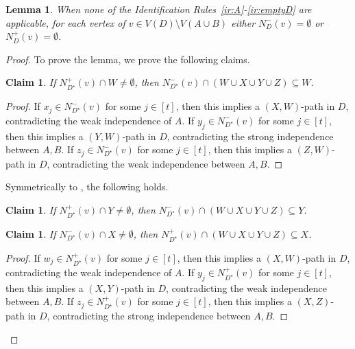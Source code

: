\documentclass[a4paper,11pt]{article}
\theoremstyle{plain}
\newtheorem{lemma}[theorem]{Lemma}
\newtheorem{claim}[theorem]{Claim}
\newtheorem{identification rule}{Identification Rule}
\theoremstyle{definition}
\theoremstyle{remark}
\newenvironment{claimproof}{\begin{proof}\renewcommand{\qedsymbol}{\claimqed}}{\end{proof}\renewcommand{\qedsymbol}{\plainqed}}
\let\plainqed\qedsymbol
\newcommand{\claimqed}{$\lrcorner$}
\begin{document}
\begin{lemma}\label{lem:ordered-cleaning-exhaustive}
When none of the Identification Rules~\ref{ir:A}-\ref{ir:emptyD} are applicable, for each vertex of $v \in V(D) \setminus V(A\cup B)$ either $N_D^-(v) =\emptyset$ or $N_D^+(v) = \emptyset$.
\end{lemma}
\begin{proof}
To prove the lemma, we prove the following claims.

\begin{claim}\label{claim:ordered-ir}
If $N_{D^{\star}}^+(v) \cap W \neq \emptyset$, then
$ N_{D^{\star}}^-(v) \cap (W \cup X \cup Y \cup Z) \subseteq W$. 
\end{claim}

\begin{claimproof}
If $x_j \in N_{D^{\star}}^-(v) $ for some $j \in [t]$, then this implies a $(X,W)$-path in $D$, contradicting the weak independence of $A$.
If $y_j \in N_{D^{\star}}^-(v)$ for some $j \in [t]$, then this implies a $(Y,W)$-path in $D$, contradicting the strong independence between $A,B$. 
If $z_j \in N_{D^{\star}}^-(v)$ for some $j \in [t]$, then this implies a $(Z,W)$-path in $D$, contradicting the weak independence between $A,B$. 
\end{claimproof}

Symmetrically to , the following holds.

\begin{claim}\label{claim:ordered-ir2}
If $N_{D^{\star}}^+(v) \cap Y \neq \emptyset$, then
$ N_{D^{\star}}^-(v) \cap (W \cup X \cup Y \cup Z) \subseteq Y$. 
\end{claim}

\begin{claim}\label{claim:ordered-ir3}
If $N_{D^{\star}}^-(v) \cap X \neq \emptyset$, then
$ N_{D^{\star}}^+(v) \cap (W \cup X \cup Y \cup Z) \subseteq X$. 
\end{claim}

\begin{claimproof}
If $w_j \in N_{D^{\star}}^+(v) $ for some $j \in [t]$, then this implies a $(X,W)$-path in $D$, contradicting the weak independence of $A$.
If $y_j \in N_{D^{\star}}^+(v)$ for some $j \in [t]$, then this implies a $(X,Y)$-path in $D$, contradicting the weak independence between $A,B$. 
If $z_j \in N_{D^{\star}}^+(v)$ for some $j \in [t]$, then this implies a $(X,Z)$-path in $D$, contradicting the strong independence between $A,B$. 
\end{claimproof}


\end{proof}
\end{document}
